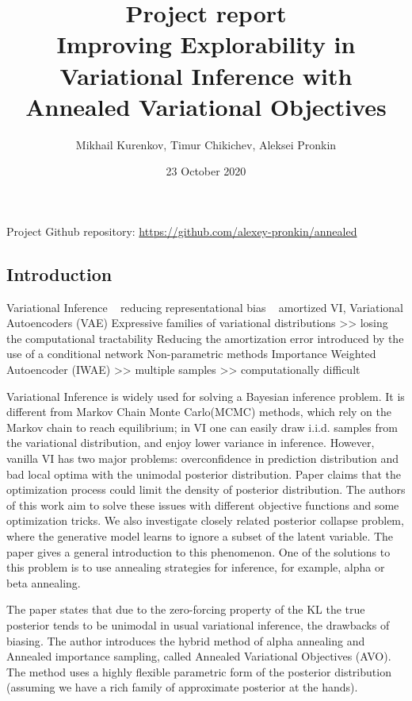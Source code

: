 \documentclass[a4paper]{article}
\title{Project report \\ Improving Explorability in Variational Inference with Annealed Variational Objectives}
\author{Mikhail Kurenkov, Timur Chikichev, Aleksei Pronkin}
\date{23 October 2020}
\begin{document}
\maketitle

Project Github repository:
\url{https://github.com/alexey-pronkin/annealed}

\subsection*{Introduction}

Variational Inference ~ reducing representational bias ~ amortized VI, Variational Autoencoders (VAE)
Expressive families of variational distributions >> losing the computational tractability
Reducing the amortization error introduced by the use of a conditional network
Non-parametric methods
Importance Weighted Autoencoder (IWAE) >> multiple samples >> computationally difficult


Variational Inference is widely used for solving a Bayesian inference problem. It is different from Markov Chain Monte Carlo(MCMC) methods, which rely on the Markov chain to reach equilibrium; in VI one can easily draw i.i.d. samples from the variational distribution, and enjoy lower variance in inference. However, vanilla VI has two major problems: overconfidence in prediction distribution and bad local optima with the unimodal posterior distribution. Paper \cite{main_Huang2018ImprovingEI} claims that the optimization process could limit the density of posterior distribution. The authors of this work aim to solve these issues with different objective functions and some optimization tricks. We also investigate closely related posterior collapse problem, where the generative model learns to ignore a subset of the latent variable. The paper \cite{lucas2019understanding} gives a general introduction to this phenomenon. One of the solutions to this problem is to use annealing strategies for inference, for example, alpha or beta annealing. 

The paper \cite{main_Huang2018ImprovingEI} states that due to the zero-forcing property of the KL the true posterior tends to be unimodal in usual variational inference, {the drawbacks of biasing}.
The author introduces the hybrid method of alpha annealing and Annealed importance sampling, called Annealed Variational Objectives (AVO). The method uses a highly flexible parametric form of the posterior distribution (assuming we have a rich family of approximate posterior at the hands). %
\end{document}
